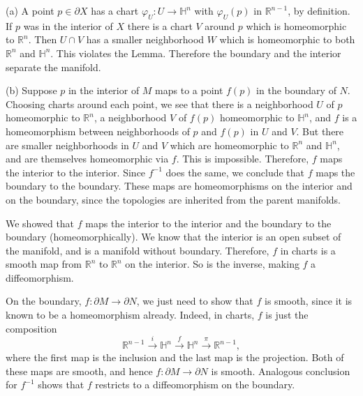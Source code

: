 \documentclass{amsart}
\numberwithin{equation}{section}
\theoremstyle{plain}
\theoremstyle{definition}
\theoremstyle{remark}
\renewcommand{\_}[2]{\underbrace{#1}_{#2}}
\renewcommand{\^}[2]{\overbrace{#1}_{#2}}
\newcommand{\R}{\mathbb{R}}
\renewcommand{\H}{\mathbb{H}}
\begin{document}
(a) A point $p \in \partial X$ has a chart $\varphi_U:U\to \H^n$ with $\varphi_U(p)$ in $\R^{n-1}$, by definition. If $p$ was in the interior of $X$ there is a chart $V$ around $p$ which is homeomorphic to $\R^n$. Then $U\cap V$ has a smaller neighborhood $W$ which is homeomorphic to both $\R^n$ and $\H^n$. This violates the Lemma. Therefore the boundary and the interior separate the manifold.

(b) Suppose $p$ in the interior of $M$ maps to a point $f(p)$ in the boundary of $N$. Choosing charts around each point, we see that there is a neighborhood $U$ of $p$ homeomorphic to $\R^n$, a neighborhood $V$ of $f(p)$ homeomorphic to $\H^n$, and $f$ is a homeomorphism between neighborhoods of $p$ and $f(p)$ in $U$ and $V$. But there are smaller neighborhoods in $U$ and $V$ which are homeomorphic to $\R^n$ and $\H^n$, and are themselves homeomorphic via $f$. This is impossible. Therefore, $f$ maps the interior to the interior. Since $f^{-1}$ does the same, we conclude that $f$ maps the boundary to the boundary. These maps are homeomorphisms on the interior and on the boundary, since the topologies are inherited from the parent manifolds.

We showed that $f$ maps the interior to the interior and the boundary to the boundary (homeomorphically). We know that the interior is an open subset of the manifold, and is a manifold without boundary. Therefore, $f$ in charts is a smooth map from $\R^n$ to $\R^n$ on the interior. So is the inverse, making $f$ a diffeomorphism.

On the boundary, $f: \partial M \to \partial N$, we just need to show that $f$ is smooth, since it is known to be a homeomorphism already. Indeed, in charts, $f$ is just the composition \[\R^{n-1} \stackrel{i}\to \H^n \stackrel{f}{\to} \H^n \stackrel{\pi}\to \R^{n-1},\] where the first map is the inclusion and the last map is the projection. Both of these maps are smooth, and hence $f:\partial M \to \partial N$ is smooth. Analogous conclusion for $f^{-1}$ shows that $f$ restricts to a diffeomorphism on the boundary.
\end{document}
